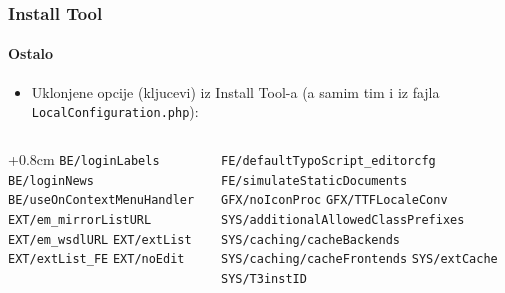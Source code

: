 
\begin{frame}[fragile]
	\frametitle{Install Tool}
	\framesubtitle{Ostalo}

	\begin{itemize}
		\item Uklonjene opcije (kljucevi) iz Install Tool-a\newline
			\small(a samim tim i iz fajla \texttt{LocalConfiguration.php}):\normalsize
	\end{itemize}

	\begin{columns}[T]
		\begin{column}{.5\textwidth}
			\advance\leftskip+0.8cm
			\smaller
				\texttt{BE/loginLabels}\newline
				\texttt{BE/loginNews}\newline
				\texttt{BE/useOnContextMenuHandler}\newline
				\texttt{EXT/em\_mirrorListURL}\newline
				\texttt{EXT/em\_wsdlURL}\newline
				\texttt{EXT/extList}\newline
				\texttt{EXT/extList\_FE}\newline
				\texttt{EXT/noEdit}\newline
			\normalsize
		\end{column}
		\begin{column}{.5\textwidth}
			\smaller
				\texttt{FE/defaultTypoScript\_editorcfg}\newline
				\texttt{FE/simulateStaticDocuments}\newline
				\texttt{GFX/noIconProc}\newline
				\texttt{GFX/TTFLocaleConv}\newline
				\texttt{SYS/additionalAllowedClassPrefixes}\newline
				\texttt{SYS/caching/cacheBackends}\newline
				\texttt{SYS/caching/cacheFrontends}\newline
				\texttt{SYS/extCache}\newline
				\texttt{SYS/T3instID}\newline
			\normalsize
		\end{column}

	\end{columns}

\end{frame}


